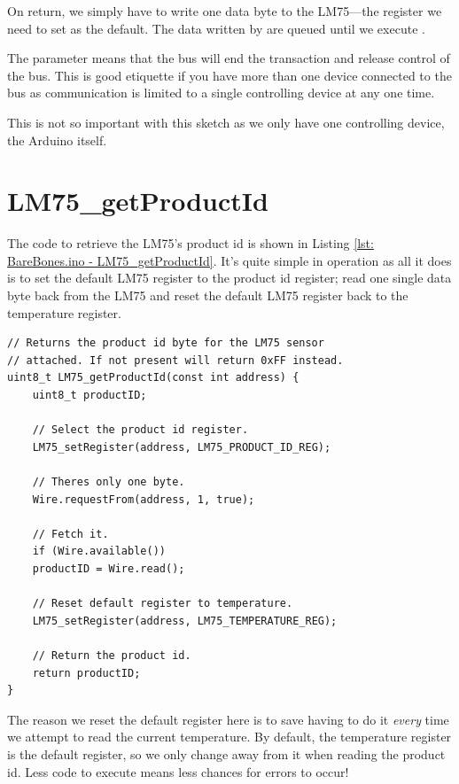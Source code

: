 On return, we simply have to write one data byte to the LM75---the register we need to set as the default. The data written by  are queued until we execute .

The  parameter means that the \twi{} bus will end the transaction and release control of the \twi{} bus. This is good etiquette if you have more than one \twi{} device connected to the bus as communication is limited to a single controlling device at any one time.

This is not so important with this sketch as we only have one controlling device, the Arduino itself.


\section{LM75\_getProductId}

The code to retrieve the LM75's product id is shown in Listing \ref{lst: BareBones.ino - LM75_getProductId}. It's quite simple in operation as all it does is to set the default LM75 register to the product id register; read one single data byte back from the LM75 and reset the default LM75 register back to the temperature register.


\begin{lstlisting}[caption={BareBones.ino - LM75\_getProductId.},label={lst: BareBones.ino - LM75_getProductId}, style=myArduino, firstnumber=106]
// Returns the product id byte for the LM75 sensor
// attached. If not present will return 0xFF instead.
uint8_t LM75_getProductId(const int address) {
    uint8_t productID;

    // Select the product id register.
    LM75_setRegister(address, LM75_PRODUCT_ID_REG);

    // Theres only one byte.
    Wire.requestFrom(address, 1, true);

    // Fetch it.
    if (Wire.available())
    productID = Wire.read();

    // Reset default register to temperature.
    LM75_setRegister(address, LM75_TEMPERATURE_REG);

    // Return the product id.
    return productID;
}
\end{lstlisting}

The reason we reset the default register here is to save having to do it \emph{every} time we attempt to read the current temperature. By default, the temperature register is the default register, so we only change away from it when reading the product id. Less code to execute means less chances for errors to occur!

